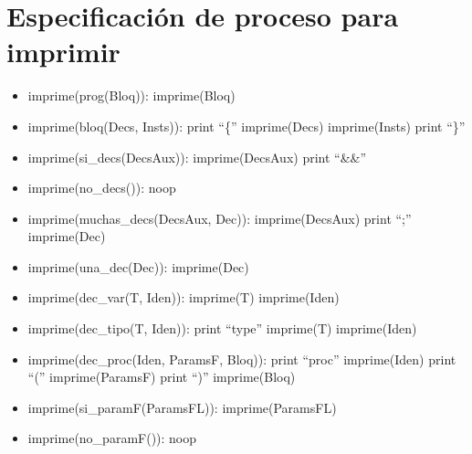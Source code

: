 \documentclass[11pt]{article}
\begin{document}
    \section{Especificación de proceso para imprimir}
        \begin{itemize}
            \item imprime(prog(Bloq)):
                \subitem imprime(Bloq)
            
            \item imprime(bloq(Decs, Insts)):
                \subitem print “\{”
                \subitem imprime(Decs)
                \subitem imprime(Insts)
                \subitem print “\}”
            
            \item imprime(si\_decs(DecsAux)):
                \subitem imprime(DecsAux)
                \subitem print “\&\&”
            
            \item imprime(no\_decs()): noop
            
            \item imprime(muchas\_decs(DecsAux, Dec)):
                \subitem imprime(DecsAux)
                \subitem print “;”
                \subitem imprime(Dec)
            
            \item imprime(una\_dec(Dec)):
                \subitem imprime(Dec)
            
            \item imprime(dec\_var(T, Iden)):
                \subitem imprime(T)
                \subitem imprime(Iden)
            
            \item imprime(dec\_tipo(T, Iden)):
                \subitem print “type”
                \subitem imprime(T)
                \subitem imprime(Iden)
            
            \item imprime(dec\_proc(Iden, ParamsF, Bloq)):
                \subitem print “proc”
                \subitem imprime(Iden)
                \subitem print “(”
                \subitem imprime(ParamsF)
                \subitem print “)”
                \subitem imprime(Bloq)
            
            \item imprime(si\_paramF(ParamsFL)):
                \subitem imprime(ParamsFL)
            
            \item imprime(no\_paramF()): noop
            

\end{itemize}
\end{document}
